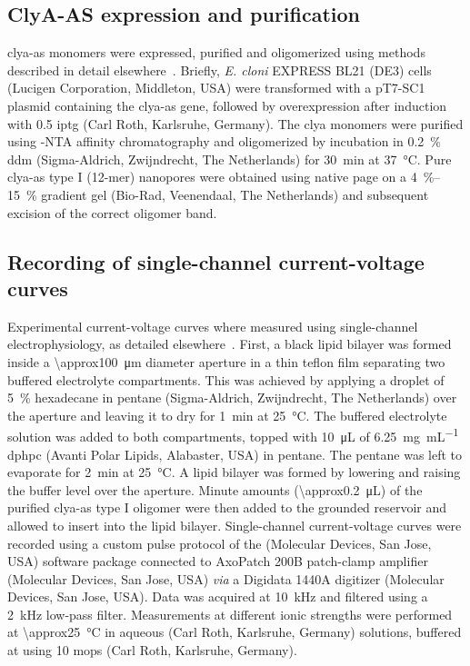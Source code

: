 \subsection{{ClyA-AS} expression and purification}
%

\Gls{clya-as} monomers were expressed, purified and oligomerized using methods described in detail
elsewhere~\cite{Soskine-2012,Soskine-2013}. Briefly, \textit{E. cloni} {EXPRESS BL21} (DE3) cells (Lucigen
Corporation, Middleton, USA) were transformed with a {pT7-SC1} plasmid containing the \gls{clya-as} gene,
followed by overexpression after induction with \SI{0.5}{\mM} \gls{iptg} (Carl Roth, Karlsruhe, Germany). The
\gls{clya} monomers were purified using -NTA affinity chromatography and oligomerized by incubation in
\SI{0.2}{\percent} \gls{ddm} (Sigma-Aldrich, Zwijndrecht, The Netherlands) for \SI{30}{\minute} at
\SI{37}{\celsius}. Pure \gls{clya-as} {type I} (12-mer) nanopores were obtained using native \gls{page} on a
\SIrange[range-phrase = --]{4}{15}{\percent} gradient gel (Bio-Rad, Veenendaal, The Netherlands) and
subsequent excision of the correct oligomer band.

\subsection{Recording of single-channel current-voltage curves}
%

Experimental current-voltage curves where measured using single-channel electrophysiology, as detailed
elsewhere~\cite{Maglia-2010,Soskine-2012,Soskine-2013}. First, a black lipid bilayer was formed inside a
\SI{\approx100}{\um} diameter aperture in a thin teflon film separating two buffered electrolyte compartments.
This was achieved by applying a droplet of \SI{5}{\percent} hexadecane in pentane (Sigma-Aldrich, Zwijndrecht,
The Netherlands) over the aperture and leaving it to dry for \SI{1}{\minute} at \SI{25}{\celsius}. The
buffered electrolyte solution was added to both compartments, topped with \SI{10}{\uL} of
\SI{6.25}{\milli\gram\per\milli\liter} \gls{dphpc} (Avanti Polar Lipids, Alabaster, USA) in pentane. The
pentane was left to evaporate for \SI{2}{\minute} at \SI{25}{\celsius}. A lipid bilayer was formed by lowering
and raising the buffer level over the aperture. Minute amounts (\SI{\approx0.2}{\uL}) of the purified
\gls{clya-as} {type I} oligomer were then added to the grounded \cisi{} reservoir and allowed to insert into
the lipid bilayer. Single-channel current-voltage curves were recorded using a custom pulse protocol of the
 (Molecular Devices, San Jose, USA) software package connected to AxoPatch 200B patch-clamp
amplifier (Molecular Devices, San Jose, USA) \textit{via} a Digidata 1440A digitizer (Molecular Devices, San
Jose, USA). Data was acquired at \SI{10}{\kHz} and filtered using a \SI{2}{\kHz} low-pass filter. Measurements
at different ionic strengths were performed at \SI{\approx25}{\celsius} in aqueous  (Carl Roth,
Karlsruhe, Germany) solutions, buffered at  using \SI{10}{\mM} \gls{mops} (Carl Roth, Karlsruhe,
Germany).



